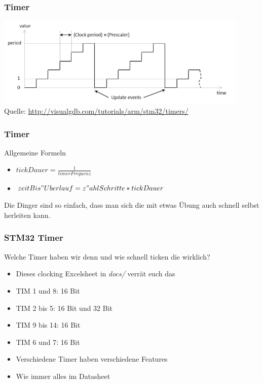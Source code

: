 \documentclass[ngerman,compress]{beamer}
\begin{document}
\begin{frame}
	\frametitle{Timer}
	\includegraphics[height=1.7in]{01-timer.png} \\
	\footnotesize{Quelle: \url{http://visualgdb.com/tutorials/arm/stm32/timers/}}
\end{frame}

\begin{frame}
	\frametitle{Timer}
	Allgemeine Formeln
	\begin{itemize}
		\item $tickDauer = \frac{1}{timerFrequenz}$
		\item $zeitBis"Uberlauf = z"ahlSchritte * tickDauer$
	\end{itemize}
	Die Dinger sind so einfach, dass man sich die mit etwas Übung auch schnell selbst herleiten kann.
\end{frame}

\begin{frame}
	\frametitle{STM32 Timer}
	Welche Timer haben wir denn und wie schnell ticken die wirklich?
	\begin{itemize}
		\item Dieses clocking Excelsheet in \emph{docs/} verrät euch das
		\item TIM 1 und 8: 16 Bit
		\item TIM 2 bis 5: 16 Bit und 32 Bit
		\item TIM 9 bis 14: 16 Bit
		\item TIM 6 und 7: 16 Bit
		\item Verschiedene Timer haben verschiedene Features
		\item Wie immer alles im Datasheet
	\end{itemize}
\end{frame}
\end{document}
